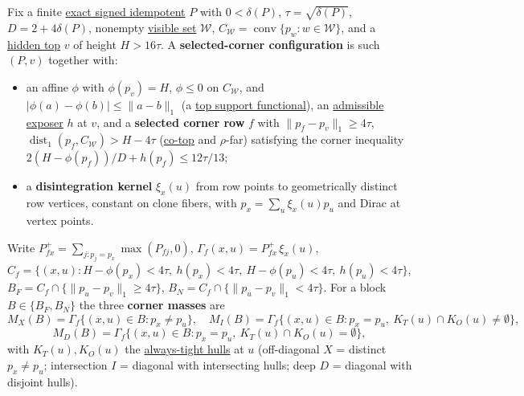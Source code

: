 \hypertarget{def:selected-corner}{}%
\begin{definition}\label{def:selected-corner}
Fix a finite \hyperref[def:signed-idempotent]{exact signed idempotent} $P$ with $0<\delta(P)$,
$\tau=\sqrt{\delta(P)}$, $D=2+4\delta(P)$, nonempty \hyperref[def:visible-set]{visible set} $\mathcal W$,
$C_{\mathcal W}=\operatorname{conv}\{p_w:w\in\mathcal W\}$, and a \hyperref[def:height]{hidden top} $v$ of
height $H>16\tau$. A \textbf{selected-corner configuration} is such $(P,v)$ together with:

\begin{itemize}
\item an affine $\phi$ with $\phi(p_v)=H$, $\phi\le0$ on $C_{\mathcal W}$, and $|\phi(a)-\phi(b)|\le\lVert a-b\rVert_1$
(a \hyperref[def:top-support-functional]{top support functional}), an \hyperref[def:exposed]{admissible exposer} $h$ at
$v$, and a \textbf{selected corner row} $f$ with $\lVert p_f-p_v\rVert_1\ge4\tau$,
$\operatorname{dist}_1(p_f,C_{\mathcal W})>H-4\tau$ (\hyperref[def:co-top]{co-top} and $\rho$-far) satisfying
the corner inequality $2(H-\phi(p_f))/D+h(p_f)\le 12\tau/13$;
\item a \textbf{disintegration kernel} $\xi_x(u)$ from row points to geometrically distinct row vertices,
constant on clone fibers, with $p_x=\sum_u\xi_x(u)p_u$ and Dirac at vertex points.
\end{itemize}

Write $P^+_{fx}=\sum_{j:p_j=p_x}\max(P_{fj},0)$, $\Gamma_f(x,u)=P^+_{fx}\,\xi_x(u)$,
$C_f=\{(x,u):H-\phi(p_x)<4\tau,\ h(p_x)<4\tau,\ H-\phi(p_u)<4\tau,\ h(p_u)<4\tau\}$,
$B_F=C_f\cap\{\lVert p_u-p_v\rVert_1\ge4\tau\}$, $B_N=C_f\cap\{\lVert p_u-p_v\rVert_1<4\tau\}$. For a
block $B\in\{B_F,B_N\}$ the three \textbf{corner masses} are
\[M_X(B)=\Gamma_f\{(x,u)\in B:p_x\ne p_u\},\quad
  M_I(B)=\Gamma_f\{(x,u)\in B:p_x=p_u,\ K_T(u)\cap K_O(u)\ne\emptyset\},\]
\[M_D(B)=\Gamma_f\{(x,u)\in B:p_x=p_u,\ K_T(u)\cap K_O(u)=\emptyset\},\]
with $K_T(u),K_O(u)$ the \hyperref[def:actor-hull]{always-tight hulls} at $u$ (off-diagonal $X$ = distinct
$p_x\ne p_u$; intersection $I$ = diagonal with intersecting hulls; deep $D$ = diagonal with disjoint
hulls).
\end{definition}
